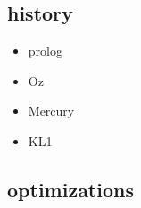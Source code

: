 
\subsection{history}
\begin{itemize}
  \item prolog
  \item Oz
  \item Mercury
  \item KL1
\end{itemize}
\subsection{optimizations}
